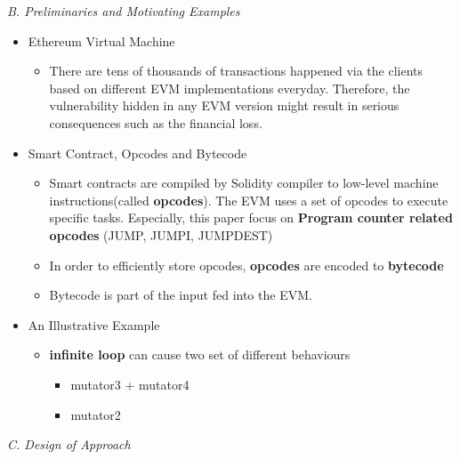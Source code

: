 \documentclass[a4paper]{article}
\begin{document}
	\textit{B. Preliminaries and Motivating Examples}
	\begin{itemize}
		\item Ethereum Virtual Machine
		\begin{itemize}
			\item  There are tens
			of thousands of transactions happened via the clients based on
			different EVM implementations everyday. Therefore, the vulnerability
			hidden in any EVM version might result in serious consequences such as the financial loss.
		\end{itemize}
		\item Smart Contract, Opcodes and Bytecode
		\begin{itemize}
			\item Smart contracts are compiled by Solidity compiler to low-level machine instructions(called \textbf{opcodes}). The EVM uses a set of opcodes to execute specific tasks. Especially, this paper focus on \textbf{Program counter related opcodes} (JUMP, JUMPI, JUMPDEST)
			\item In order to efficiently store opcodes, \textbf{opcodes} are encoded to \textbf{bytecode}
			\item Bytecode is part of the input fed into the EVM.
		\end{itemize}
		\item{An Illustrative Example}
		\begin{itemize}
			\item \textbf{infinite loop} can cause two set of different behaviours
			\begin{itemize}
				\item mutator3 + mutator4
				\item mutator2
			\end{itemize}
		\end{itemize}
	\end{itemize}
	\textit{C. Design of Approach}
\end{document}
